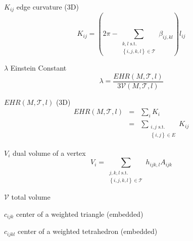 \documentclass{article}
\begin{document}
$K_{ij}$ edge curvature (3D)%
\begin{equation*}
K_{ij}=\left( 2\pi -\sum_{\substack{ k,l\text{ s.t.}  \\ \left\{
i,j,k,l\right\} \in \mathcal{T}}}\beta _{ij,kl}\right) l_{ij} 
\end{equation*}

$\lambda $ Einstein Constant%
\begin{equation*}
\lambda =\frac{EHR\left( M,\mathcal{T},l\right) }{3\mathcal{V}\left( M,%
\mathcal{T},l\right) } 
\end{equation*}

$EHR\left( M,\mathcal{T},l\right) $ (3D)%
\begin{eqnarray*}
EHR\left( M,\mathcal{T},l\right) &=&\sum_{i}K_{i} \\
&=&\sum_{\substack{ i,j\text{ s.t.}  \\ \left\{ i,j\right\} \in E}}K_{ij}
\end{eqnarray*}

$V_{i}$ dual volume of a vertex%
\begin{equation*}
V_{i}=\sum_{\substack{ j,k,l\text{ s.t.}  \\ \left\{ i,j,k,l\right\} \in 
\mathcal{T}}}h_{ijk,l}A_{ijk} 
\end{equation*}

$\mathcal{V}$ total volume

$c_{ijk}$ center of a weighted triangle (embedded)

$c_{ijkl}$ center of a weighted tetrahedron (embedded)
\end{document}
